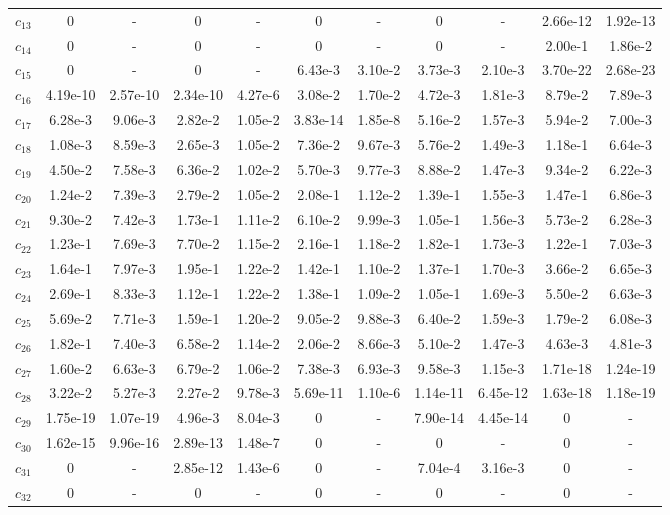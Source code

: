 \begin{table}[p]
{\begin{tabular}{lcc@{\hspace{16pt}}cc@{\hspace{16pt}}cc@{\hspace{16pt}}cc@{\hspace{16pt}}cc}
$c_{13}$ & 0 & - & 0 & - & 0 & - & 0 & - & 2.66e-12 & 1.92e-13 \\
$c_{14}$ & 0 & - & 0 & - & 0 & - & 0 & - & 2.00e-1 & 1.86e-2 \\
$c_{15}$ & 0 & - & 0 & - & 6.43e-3 & 3.10e-2 & 3.73e-3 & 2.10e-3 & 3.70e-22 & 2.68e-23 \\
$c_{16}$ & 4.19e-10 & 2.57e-10 & 2.34e-10 & 4.27e-6 & 3.08e-2 & 1.70e-2 & 4.72e-3 & 1.81e-3 & 8.79e-2 & 7.89e-3 \\
$c_{17}$ & 6.28e-3 & 9.06e-3 & 2.82e-2 & 1.05e-2 & 3.83e-14 & 1.85e-8 & 5.16e-2 & 1.57e-3 & 5.94e-2 & 7.00e-3 \\
$c_{18}$ & 1.08e-3 & 8.59e-3 & 2.65e-3 & 1.05e-2 & 7.36e-2 & 9.67e-3 & 5.76e-2 & 1.49e-3 & 1.18e-1 & 6.64e-3 \\
$c_{19}$ & 4.50e-2 & 7.58e-3 & 6.36e-2 & 1.02e-2 & 5.70e-3 & 9.77e-3 & 8.88e-2 & 1.47e-3 & 9.34e-2 & 6.22e-3 \\
$c_{20}$ & 1.24e-2 & 7.39e-3 & 2.79e-2 & 1.05e-2 & 2.08e-1 & 1.12e-2 & 1.39e-1 & 1.55e-3 & 1.47e-1 & 6.86e-3 \\
$c_{21}$ & 9.30e-2 & 7.42e-3 & 1.73e-1 & 1.11e-2 & 6.10e-2 & 9.99e-3 & 1.05e-1 & 1.56e-3 & 5.73e-2 & 6.28e-3 \\
$c_{22}$ & 1.23e-1 & 7.69e-3 & 7.70e-2 & 1.15e-2 & 2.16e-1 & 1.18e-2 & 1.82e-1 & 1.73e-3 & 1.22e-1 & 7.03e-3 \\
$c_{23}$ & 1.64e-1 & 7.97e-3 & 1.95e-1 & 1.22e-2 & 1.42e-1 & 1.10e-2 & 1.37e-1 & 1.70e-3 & 3.66e-2 & 6.65e-3 \\
$c_{24}$ & 2.69e-1 & 8.33e-3 & 1.12e-1 & 1.22e-2 & 1.38e-1 & 1.09e-2 & 1.05e-1 & 1.69e-3 & 5.50e-2 & 6.63e-3 \\
$c_{25}$ & 5.69e-2 & 7.71e-3 & 1.59e-1 & 1.20e-2 & 9.05e-2 & 9.88e-3 & 6.40e-2 & 1.59e-3 & 1.79e-2 & 6.08e-3 \\
$c_{26}$ & 1.82e-1 & 7.40e-3 & 6.58e-2 & 1.14e-2 & 2.06e-2 & 8.66e-3 & 5.10e-2 & 1.47e-3 & 4.63e-3 & 4.81e-3 \\
$c_{27}$ & 1.60e-2 & 6.63e-3 & 6.79e-2 & 1.06e-2 & 7.38e-3 & 6.93e-3 & 9.58e-3 & 1.15e-3 & 1.71e-18 & 1.24e-19 \\
$c_{28}$ & 3.22e-2 & 5.27e-3 & 2.27e-2 & 9.78e-3 & 5.69e-11 & 1.10e-6 & 1.14e-11 & 6.45e-12 & 1.63e-18 & 1.18e-19 \\
$c_{29}$ & 1.75e-19 & 1.07e-19 & 4.96e-3 & 8.04e-3 & 0 & - & 7.90e-14 & 4.45e-14 & 0 & - \\
$c_{30}$ & 1.62e-15 & 9.96e-16 & 2.89e-13 & 1.48e-7 & 0 & - & 0 & - & 0 & - \\
$c_{31}$ & 0 & - & 2.85e-12 & 1.43e-6 & 0 & - & 7.04e-4 & 3.16e-3 & 0 & - \\
$c_{32}$ & 0 & - & 0 & - & 0 & - & 0 & - & 0 & - \\
\bottomrule
\end{tabular}}
\endgroup
\end{table}
\clearpage
